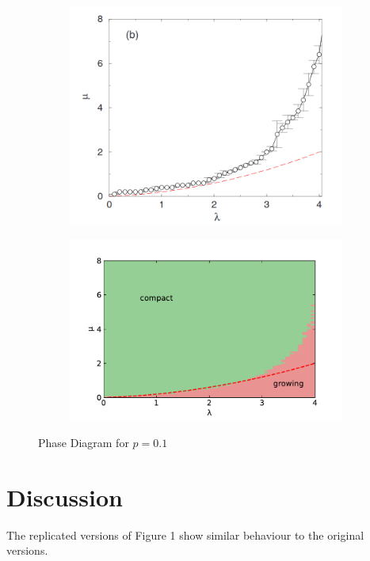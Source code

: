\documentclass[11pt]{article}
\begin{document}
\begin{figure}[!h]
	\centering
	\begin{subfigure}{\linewidth}
		\centering
		\includegraphics[width=14cm]{plots/6b.png}
	\end{subfigure}
	\begin{subfigure}{\linewidth}
		\centering
		\includegraphics[width=15cm]{plots/6b.pdf}
	\end{subfigure}
	\caption{Phase Diagram for $p=0.1$}
\end{figure}

\clearpage
\section{Discussion}
\label{sec:disc}
The replicated versions of Figure 1 show similar behaviour to the original versions.\\
\end{document}
